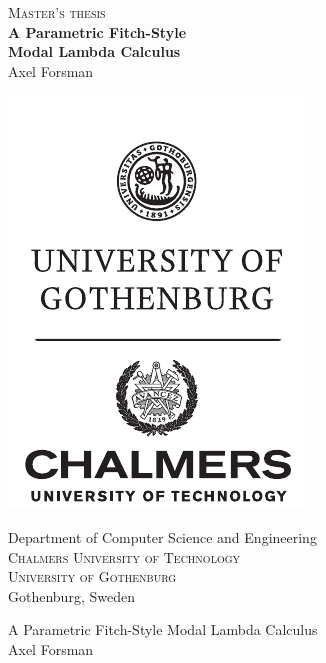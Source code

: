 \documentclass[12pt,twoside,openright]{report}
\numberwithin{equation}{chapter}
\numberwithin{figure}{chapter}
\numberwithin{table}{chapter}
\theoremstyle{definition}\newtheorem{definition}{Definition}
\newcommand{\oneLineTitle}{A Parametric Fitch-Style Modal Lambda Calculus}
\newcommand{\multiLineTitle}[1]{A Parametric Fitch-Style \\[#1] Modal Lambda Calculus}
\begin{document}
\newpage
\renewcommand{\familydefault}{\rmdefault}\normalfont
\restoregeometry
\thispagestyle{empty}
\mbox{}

\newpage
\thispagestyle{empty}
\begin{center}
	\textsc{\large Master's thesis \the\year} \\[4cm]
	\textbf{\Large \multiLineTitle{0.2cm}} \\[2cm]
	{\large Axel Forsman}

	\vfill
    \begin{center}
	\includegraphics[width=0.25\pagewidth]{ChGULogo}
    \end{center}
	\vspace{5mm}

	Department of Computer Science and Engineering \\
	\textsc{Chalmers University of Technology} \\
	\textsc{University of Gothenburg} \\
	Gothenburg, Sweden \the\year \\
\end{center}

\newpage
\thispagestyle{plain}
\vspace*{4.5cm}
\oneLineTitle \\
Axel Forsman \\[1cm]
\end{document}
